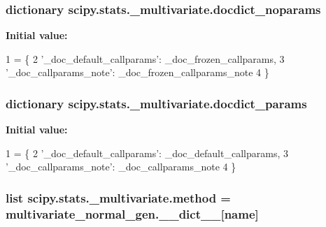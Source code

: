 \subsubsection[{docdict\+\_\+noparams}]{\setlength{\rightskip}{0pt plus 5cm}dictionary scipy.\+stats.\+\_\+multivariate.\+docdict\+\_\+noparams}\label{namespacescipy_1_1stats_1_1__multivariate_af30809f8bb166e014990565e39d68154}
{\bfseries Initial value\+:}
\begin{DoxyCode}
1 = \{
2     \textcolor{stringliteral}{'\_doc\_default\_callparams'}: \_doc\_frozen\_callparams,
3     \textcolor{stringliteral}{'\_doc\_callparams\_note'}: \_doc\_frozen\_callparams\_note
4 \}
\end{DoxyCode}
\hypertarget{namespacescipy_1_1stats_1_1__multivariate_a26942185172919c6d9d1b57a03f6bbcd}{}
\subsubsection[{docdict\+\_\+params}]{\setlength{\rightskip}{0pt plus 5cm}dictionary scipy.\+stats.\+\_\+multivariate.\+docdict\+\_\+params}\label{namespacescipy_1_1stats_1_1__multivariate_a26942185172919c6d9d1b57a03f6bbcd}
{\bfseries Initial value\+:}
\begin{DoxyCode}
1 = \{
2     \textcolor{stringliteral}{'\_doc\_default\_callparams'}: \_doc\_default\_callparams,
3     \textcolor{stringliteral}{'\_doc\_callparams\_note'}: \_doc\_callparams\_note
4 \}
\end{DoxyCode}
\hypertarget{namespacescipy_1_1stats_1_1__multivariate_aba344cec13175c0603e383f7176e695d}{}
\subsubsection[{method}]{\setlength{\rightskip}{0pt plus 5cm}list scipy.\+stats.\+\_\+multivariate.\+method = multivariate\+\_\+normal\+\_\+gen.\+\_\+\+\_\+dict\+\_\+\+\_\+\mbox{[}name\mbox{]}}\label{namespacescipy_1_1stats_1_1__multivariate_aba344cec13175c0603e383f7176e695d}
\hypertarget{namespacescipy_1_1stats_1_1__multivariate_a0960680809ec621835afefb2c3742e7f}{}
